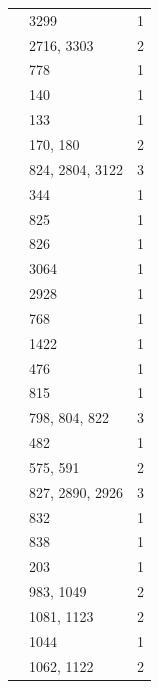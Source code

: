 \begin{longtable}{@{}p{}p{}p{}@{}}
\cite[Lemma~2.3(iii)]{FengLiZhang2019} & 3299 & 1 \\
\cite[Lemma~2.5]{FengLiZhang2019} & 2716, 3303 & 2 \\
\cite[Section~2.3]{FengLiZhang2019} & 778 & 1 \\
\cite[Theorems~1.2 and~1.4]{FengLiZhang2019} & 140 & 1 \\
\cite[Theorem~1.5]{FengLiZhang2019} & 133 & 1 \\
\cite{FengLiZhang2022Jordan} & 170, 180 & 2 \\
\cite[Assumption~5.3]{FengLiZhang2022Jordan} & 824, 2804, 3122 & 3 \\
\cite[Definition~3.5]{FengLiZhang2022Jordan} & 344 & 1 \\
\cite[Hypothesis~5.5(a)]{FengLiZhang2022Jordan} & 825 & 1 \\
\cite[Hypothesis~5.5(b)]{FengLiZhang2022Jordan} & 826 & 1 \\
\cite[Lemma~5.1 and the proof of Proposition~5.2]{FengLiZhang2022Jordan} & 3064 & 1 \\
\cite[Proposition~5.6]{FengLiZhang2022Jordan} & 2928 & 1 \\
\cite[Remark~5.8]{FengLiZhang2022Jordan} & 768 & 1 \\
\cite[Remark~5.9]{FengLiZhang2022Jordan} & 1422 & 1 \\
\cite[Section~3.5]{FengLiZhang2022Jordan} & 476 & 1 \\
\cite[Section~4.3]{FengLiZhang2022Jordan} & 815 & 1 \\
\cite[Section~5]{FengLiZhang2022Jordan} & 798, 804, 822 & 3 \\
\cite[Theorems~3.18 and~5.7]{FengLiZhang2022Jordan} & 482 & 1 \\
\cite[Theorem~3.18]{FengLiZhang2022Jordan} & 575, 591 & 2 \\
\cite[Theorem~5.7]{FengLiZhang2022Jordan} & 827, 2890, 2926 & 3 \\
\cite{FengLiZhang2023Morita} & 832 & 1 \\
\cite[Theorem~1]{FengLiZhang2023Morita} & 838 & 1 \\
\cite[p.~6518]{FengLiZhang2023Morita} & 203 & 1 \\
\cite[Corollary~4.3]{FengMalle2022} & 983, 1049 & 2 \\
\cite[Corollary~4.6]{FengMalle2022} & 1081, 1123 & 2 \\
\cite[Lemma~5.1]{FengMalle2022} & 1044 & 1 \\
\cite[Proposition~3.4]{FengMalle2022} & 1062, 1122 & 2 \\

\end{longtable}
